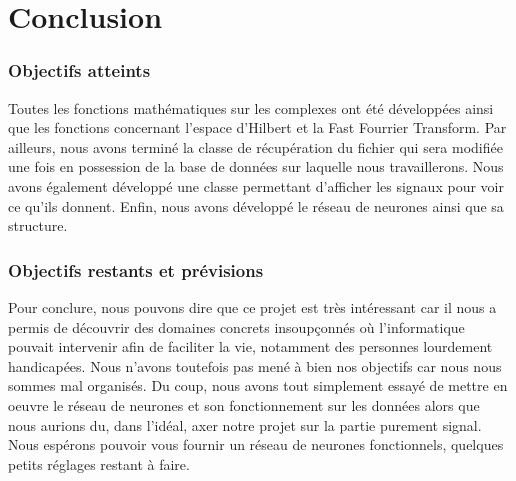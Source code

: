 \part{Conclusion}
	
	\section{Objectifs atteints} %

		Toutes les fonctions mathématiques sur les complexes ont été développées ainsi que les fonctions concernant l'espace d'Hilbert et la Fast Fourrier Transform. Par ailleurs, nous avons terminé la classe de récupération du fichier qui sera modifiée une fois en possession de la base de données sur laquelle nous travaillerons. Nous avons également développé une classe permettant d'afficher les signaux pour voir ce qu'ils donnent. Enfin, nous avons développé le réseau de neurones ainsi que sa structure. 	
	
	\label{sec:objectif_atteint}
	
	\section{Objectifs restants et prévisions} %
	\label{sec:objectif_restant}
	
	Pour conclure, nous pouvons dire que ce projet est très intéressant car il nous a permis de découvrir des domaines concrets insoupçonnés où l'informatique pouvait intervenir afin de faciliter la vie, notamment des personnes lourdement handicapées. Nous n'avons toutefois pas mené à bien nos objectifs car nous nous sommes mal organisés. Du coup, nous avons tout simplement essayé de mettre en oeuvre le réseau de neurones et son fonctionnement sur les données alors que nous aurions du, dans l'idéal, axer notre projet sur la partie purement signal. Nous espérons pouvoir vous fournir un réseau de neurones fonctionnels, quelques petits réglages restant à faire.